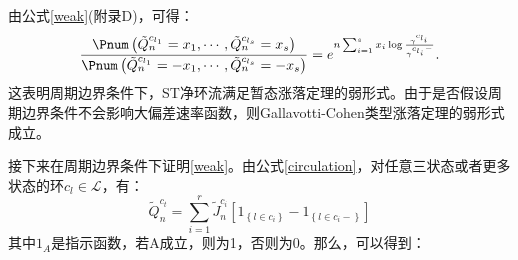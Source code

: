 由公式\ref{weak}(附录D)，可得：
\begin{equation}\label{weak}
    \begin{split}
    \frac{\Pnum\left(\tilde{Q}^{c_{l_1}}_n=x_1,\cdots, \tilde{Q}^{c_{l_s}}_n=x_{s}\right)}
    {\Pnum\left(\tilde{Q}^{c_{l_1}}_n=-x_1,\cdots, \tilde{Q}^{c_{l_s}}_n=-x_{s}\right)}
    =e^{n\sum_{i=1}^{s}x_i\log\frac{\gamma^{c_{l_i}}}{\gamma^{c_{l_i}-}}}.
    \end{split}
\end{equation}
这表明周期边界条件下，ST净环流满足暂态涨落定理的弱形式。由于是否假设周期边界条件不会影响大偏差速率函数，则Gallavotti-Cohen类型涨落定理的弱形式 \cite{pedraza2008effects} 成立。

接下来在周期边界条件下证明\ref{weak}。由公式\ref{circulation}，对任意三状态或者更多状态的环$c_l \in \mathcal{L}$，有：
\begin{equation*}
    \tilde{Q}_{n}^{c_{t}}=\sum_{i=1}^{r} \tilde{J}_{n}^{c_{i}}\left[1_{\left\{l \in c_{i}\right\}}-1_{\left\{l \in c_{i}-\right\}}\right]
\end{equation*}
其中$1_A$是指示函数，若A成立，则为1，否则为0。那么，可以得到：
